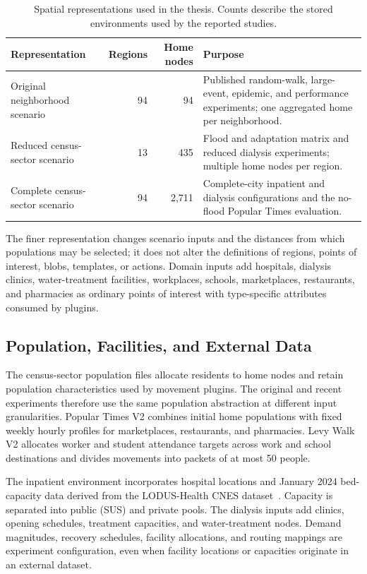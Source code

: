 \documentclass[pdflatex,sn-mathphys-num]{sn-jnl}%
\theoremstyle{thmstyleone}%
\theoremstyle{thmstyletwo}%
\theoremstyle{thmstylethree}%
\begin{document}
\begin{table}[ht]
\centering
\footnotesize
\caption{Spatial representations used in the thesis. Counts describe the stored environments used by the reported studies.}
\label{tbl:spatial_representations}
\begin{tabularx}{\linewidth}{@{}lrrX@{}}
\toprule
\textbf{Representation} & \textbf{Regions} & \textbf{Home nodes} & \textbf{Purpose} \\ \midrule
Original neighborhood scenario & 94 & 94 & Published random-walk, large-event, epidemic, and performance experiments; one aggregated home per neighborhood. \\ \midrule
Reduced census-sector scenario & 13 & 435 & Flood and adaptation matrix and reduced dialysis experiments; multiple home nodes per region. \\ \midrule
Complete census-sector scenario & 94 & 2,711 & Complete-city inpatient and dialysis configurations and the no-flood Popular Times evaluation. \\ \bottomrule
\end{tabularx}
\end{table}

The finer representation changes scenario inputs and the distances from which populations may be selected; it does not alter the definitions of regions, points of interest, blobs, templates, or actions. Domain inputs add hospitals, dialysis clinics, water-treatment facilities, workplaces, schools, marketplaces, restaurants, and pharmacies as ordinary points of interest with type-specific attributes consumed by plugins.



\subsection{Population, Facilities, and External Data}
The census-sector population files allocate residents to home nodes and retain population characteristics used by movement plugins. The original and recent experiments therefore use the same population abstraction at different input granularities. Popular Times V2 combines initial home populations with fixed weekly hourly profiles for marketplaces, restaurants, and pharmacies. Levy Walk V2 allocates worker and student attendance targets across work and school destinations and divides movements into packets of at most 50 people.

The inpatient environment incorporates hospital locations and January 2024 bed-capacity data derived from the LODUS-Health CNES dataset~\citep{souza2026lodushealth}. Capacity is separated into public (SUS) and private pools. The dialysis inputs add clinics, opening schedules, treatment capacities, and water-treatment nodes. Demand magnitudes, recovery schedules, facility allocations, and routing mappings are experiment configuration, even when facility locations or capacities originate in an external dataset.
\end{document}
